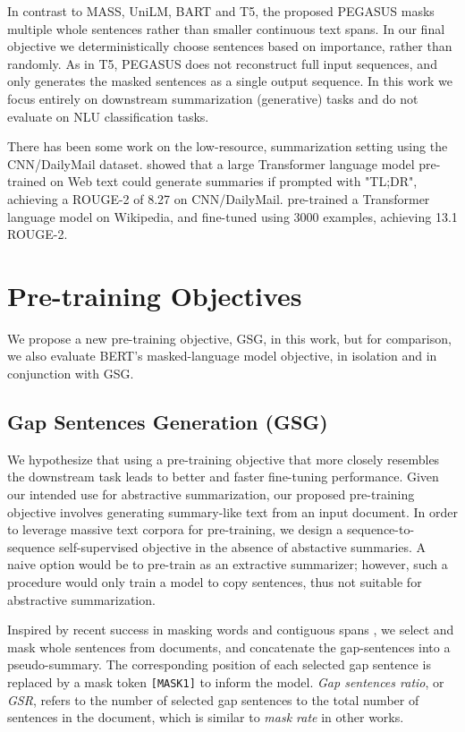 \documentclass{article}
\newcommand\todo[1]{\textcolor{red}{TODO(#1)}}
\begin{document}
In contrast to MASS, UniLM, BART and T5, the proposed PEGASUS masks multiple whole sentences rather than smaller continuous text spans. In our final objective we deterministically
choose sentences based on importance, rather than randomly. As in T5, PEGASUS does not reconstruct full input sequences, and only generates
the masked sentences as a single output sequence.
In this work we focus entirely on downstream summarization (generative) tasks and
do not evaluate on NLU classification tasks.

There has been some work on the low-resource, summarization setting using
the CNN/DailyMail dataset.
\citet{gpt2} showed that a large Transformer language model pre-trained on Web text
could generate summaries if prompted with "TL;DR", achieving a ROUGE-2 of 8.27 
on CNN/DailyMail. \citet{khandelwal2019sample}
pre-trained a Transformer language model on Wikipedia, and fine-tuned
using 3000 examples, achieving 13.1 ROUGE-2.



\section{Pre-training Objectives}
\label{sec:methodology}

We propose a new pre-training objective, GSG,
in this work, but
for comparison, we also evaluate BERT's masked-language model objective, in isolation
and in conjunction with GSG. 


\subsection{Gap Sentences Generation (GSG)}
\label{sec:gsg}
We hypothesize that using a pre-training
objective that more closely resembles
the downstream task leads to better
and faster fine-tuning performance.
Given our intended use for abstractive summarization, our proposed pre-training
objective involves
generating summary-like text from
an input document. In order to leverage
massive text corpora for pre-training, 
we design a sequence-to-sequence  self-supervised objective
in the absence of abstactive summaries.
A naive option
would be to pre-train as an extractive
summarizer; however, such a procedure would
only train a model to copy sentences, thus not suitable for abstractive summarization.

Inspired by recent success in masking
words and contiguous spans \citep{joshi2019spanbert,raffel2019exploring}, 
we select and mask whole sentences from
documents, and concatenate the gap-sentences
into a pseudo-summary. 
 The corresponding position of each selected gap sentence is replaced by a mask token \texttt{[MASK1]} to inform the model. \emph{Gap sentences ratio}, or \emph{GSR},
 refers to the number of selected gap sentences to the total number of sentences in the document, which is similar to \emph{mask rate} in other works.
 
\end{document}
